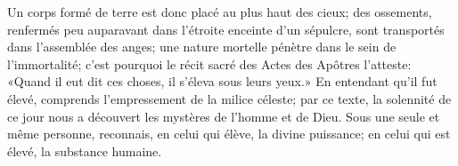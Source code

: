 Un corps formé de terre est donc placé au plus haut des cieux;
	des ossements,
		renfermés peu auparavant dans l’étroite enceinte d’un sépulcre,
	sont transportés dans l’assemblée des anges;
	une nature mortelle pénètre dans le sein de l’immortalité;
	c’est pourquoi le récit sacré des Actes des Apôtres l’atteste:
	«Quand il eut dit ces choses, il s’éleva sous leurs yeux.»
En entendant qu’il fut élevé, comprends l’empressement de la milice céleste;
	par ce texte, la solennité de ce jour
		nous a découvert les mystères de l’homme et de Dieu.
Sous une seule et même personne,
	reconnais, en celui qui élève, la divine puissance;
	en celui qui est élevé, la substance humaine.
